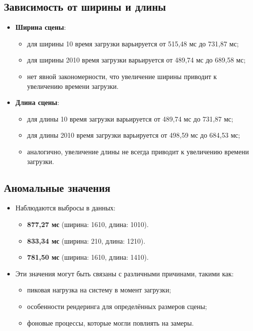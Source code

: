 \subsection{Зависимость от ширины и длины}
\begin{itemize}
    \item \textbf{Ширина сцены}:
    \begin{itemize}
        \item для ширины 10 время загрузки варьируется от 515,48 мс до 731,87 мс;
        \item для ширины 2010 время загрузки варьируется от 489,74 мс до 689,58 мс;
        \item нет явной закономерности, что увеличение ширины приводит к увеличению времени загрузки.
    \end{itemize}
    
    \item \textbf{Длина сцены}:
    \begin{itemize}
        \item для длины 10 время загрузки варьируется от 489,74 мс до 731,87 мс;
        \item для длины 2010 время загрузки варьируется от 498,59 мс до 684,53 мс;
        \item аналогично, увеличение длины не всегда приводит к увеличению времени загрузки.
    \end{itemize}
\end{itemize}

\subsection{Аномальные значения}
\begin{itemize}
    \item Наблюдаются выбросы в данных:
    \begin{itemize}
        \item \textbf{877,27 мс} (ширина: 1610, длина: 1010).
        \item \textbf{833,34 мс} (ширина: 210, длина: 1210).
        \item \textbf{781,50 мс} (ширина: 1610, длина: 1410).
    \end{itemize}
    
    \item Эти значения могут быть связаны с различными причинами, такими как:
    \begin{itemize}
        \item пиковая нагрузка на систему в момент загрузки;
        \item особенности рендеринга для определённых размеров сцены;
        \item фоновые процессы, которые могли повлиять на замеры.
    \end{itemize}
\end{itemize}

